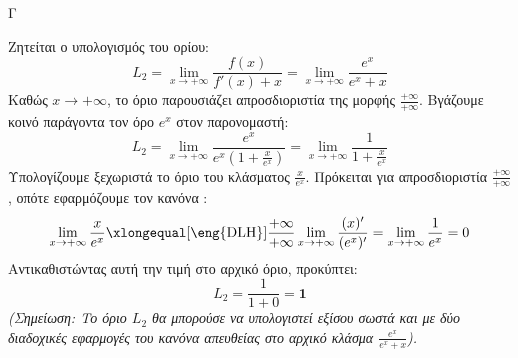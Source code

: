 \begin{thema}{Γ}
\begin{erwthma}
\item Ζητείται ο υπολογισμός του ορίου:
\[ L_2 = \lim_{x \to +\infty} \frac{f(x)}{f'(x) + x} = \lim_{x \to +\infty} \frac{e^x}{e^x + x} \]
Καθώς $x \to +\infty$, το όριο παρουσιάζει απροσδιοριστία της μορφής $\frac{+\infty}{+\infty}$.
Βγάζουμε κοινό παράγοντα τον όρο $e^x$ στον παρονομαστή:
\[ L_2 = \lim_{x \to +\infty} \frac{e^x}{e^x \left(1 + \frac{x}{e^x}\right)} = \lim_{x \to +\infty} \frac{1}{1 + \frac{x}{e^x}} \]
Υπολογίζουμε ξεχωριστά το όριο του κλάσματος $\frac{x}{e^x}$. 
Πρόκειται για απροσδιοριστία $\frac{+\infty}{+\infty}$, οπότε εφαρμόζουμε τον κανόνα :
\[ \lim_{x \to +\infty} \frac{x}{e^x} \xlongequal[\text{\eng{DLH}}]{\frac{+\infty}{+\infty}} \lim_{x \to +\infty} \frac{(x)'}{(e^x)'} = \lim_{x \to +\infty} \frac{1}{e^x} = 0 \]
Αντικαθιστώντας αυτή την τιμή στο αρχικό όριο, προκύπτει:
\[ L_2 = \frac{1}{1 + 0} = \boldsymbol{1} \]
\textit{(Σημείωση: Το όριο $L_2$ θα μπορούσε να υπολογιστεί εξίσου σωστά και με δύο διαδοχικές εφαρμογές του κανόνα  απευθείας στο αρχικό κλάσμα $\frac{e^x}{e^x+x}$).}
\end{erwthma}
\end{thema}
